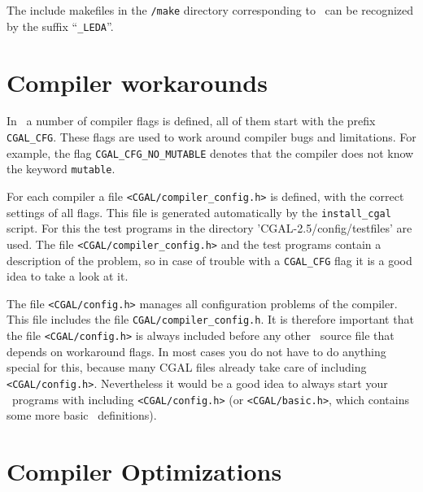 The include makefiles in the \texttt{\cgaldir/make} directory
corresponding to \leda\ can be recognized by the suffix
``\texttt{\_LEDA}''.

\section{Compiler workarounds}

In \cgal\ a number of compiler flags is defined, all of them start
with the prefix \texttt{CGAL\_CFG}. These flags are used to work
around compiler bugs and limitations.  For example, the flag
\texttt{CGAL\_CFG\_NO\_MUTABLE} denotes that the compiler does not
know the keyword \texttt{mutable}. 

For each compiler a file \texttt{<CGAL/compiler\_config.h>}
 is defined, with the correct
settings of all flags. This file is generated automatically by the
\texttt{install\_cgal} script. For this the test programs in the
directory \nonlinkedpath'CGAL-2.5/config/testfiles'
 are
used.  The file \texttt{<CGAL/compiler\_config.h>} and the test
programs contain a description of the problem, so in case of trouble
with a \texttt{CGAL\_CFG} flag it is a good idea to take a look at it.

The file \texttt{<CGAL/config.h>} 
manages all configuration problems of the compiler.  This file
includes the file \texttt{CGAL/compiler\_config.h}.  It is therefore
important that the file \texttt{<CGAL/config.h>} is always included
before any other \cgal\ source file that depends on workaround flags.
In most cases you do not have to do anything special for this, because
many CGAL files already take care of including
\texttt{<CGAL/config.h>}. Nevertheless it would be a good idea to
always start your \cgal\ programs with including
\texttt{<CGAL/config.h>} (or \texttt{<CGAL/basic.h>}, which contains
some more basic \cgal\ definitions).

\section{Compiler Optimizations}\label{sec:compiler-optimisations}

